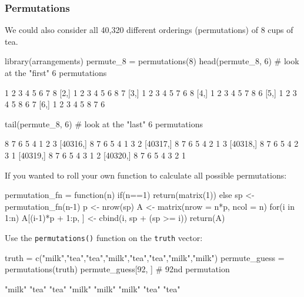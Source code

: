 \documentclass[a4paper]{article}
\begin{document}
\subsubsection{Permutations}
We could also consider all 40,320 different orderings (permutations) of 8 cups of tea.
\begin{Schunk}
\begin{Sinput}
library(arrangements)
permute_8 = permutations(8)
head(permute_8, 6) # look at the "first" 6 permutations
\end{Sinput}
\begin{Soutput}
     [,1] [,2] [,3] [,4] [,5] [,6] [,7] [,8]
[1,]    1    2    3    4    5    6    7    8
[2,]    1    2    3    4    5    6    8    7
[3,]    1    2    3    4    5    7    6    8
[4,]    1    2    3    4    5    7    8    6
[5,]    1    2    3    4    5    8    6    7
[6,]    1    2    3    4    5    8    7    6
\end{Soutput}
\begin{Sinput}
tail(permute_8, 6) # look at the "last" 6 permutations
\end{Sinput}
\begin{Soutput}
         [,1] [,2] [,3] [,4] [,5] [,6] [,7] [,8]
[40315,]    8    7    6    5    4    1    2    3
[40316,]    8    7    6    5    4    1    3    2
[40317,]    8    7    6    5    4    2    1    3
[40318,]    8    7    6    5    4    2    3    1
[40319,]    8    7    6    5    4    3    1    2
[40320,]    8    7    6    5    4    3    2    1
\end{Soutput}
\end{Schunk}
If you wanted to roll your own function to calculate all possible permutations:
\begin{Schunk}
\begin{Sinput}
permutation_fn = function(n){
  if(n==1){
    return(matrix(1))
  } else {
    sp <- permutation_fn(n-1)
    p <- nrow(sp)
    A <- matrix(nrow = n*p, ncol = n)
    for(i in 1:n){
      A[(i-1)*p + 1:p, ] <- cbind(i, sp + (sp >= i))
    }
    return(A)
  }
}
\end{Sinput}
\end{Schunk}
Use the \lstinline|permutations()| function on the \lstinline|truth| vector:
\begin{Schunk}
\begin{Sinput}
truth = c("milk","tea","tea","milk","tea","tea","milk","milk")
permute_guess = permutations(truth)
permute_guess[92, ] # 92nd permutation
\end{Sinput}
\begin{Soutput}
[1] "milk" "tea"  "tea"  "milk" "milk" "milk" "tea"  "tea" 
\end{Soutput}
\end{Schunk}
\end{document}
